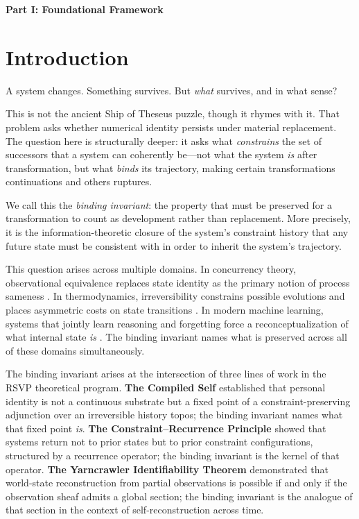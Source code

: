 \documentclass[11pt, letterpaper]{article}
\theoremstyle{plain}
\theoremstyle{definition}
\theoremstyle{remark}
\begin{document}
\newpage

\begin{center}{\large\bfseries Part I: Foundational Framework}\end{center}
\vspace{0.5em}

\section{Introduction}

A system changes. Something survives. But \emph{what} survives, and in what sense?

This is not the ancient Ship of Theseus puzzle, though it rhymes with it. That problem
asks whether numerical identity persists under material replacement. The question here
is structurally deeper: it asks what \emph{constrains} the set of successors that a
system can coherently be---not what the system \emph{is} after transformation, but what
\emph{binds} its trajectory, making certain transformations continuations and others
ruptures.

We call this the \emph{binding invariant}: the property that must be preserved for a
transformation to count as development rather than replacement. More precisely, it is
the information-theoretic closure of the system's constraint history that any future
state must be consistent with in order to inherit the system's trajectory.

This question arises across multiple domains. In concurrency theory, observational
equivalence replaces state identity as the primary notion of process sameness
\cite{haemmerle2011}. In thermodynamics, irreversibility constrains possible
evolutions and places asymmetric costs on state transitions \cite{landauer,bennett,lloyd}.
In modern machine learning, systems that jointly learn reasoning and forgetting force a
reconceptualization of what internal state \emph{is} \cite{ngc2026}. The binding
invariant names what is preserved across all of these domains simultaneously.

The binding invariant arises at the intersection of three lines of work in the RSVP
theoretical program. \textbf{The Compiled Self} established that personal identity is
not a continuous substrate but a fixed point of a constraint-preserving adjunction over
an irreversible history topos; the binding invariant names what that fixed point
\emph{is}. \textbf{The Constraint--Recurrence Principle} showed that systems return
not to prior states but to prior constraint configurations, structured by a recurrence
operator; the binding invariant is the kernel of that operator. \textbf{The Yarncrawler
Identifiability Theorem} demonstrated that world-state reconstruction from partial
observations is possible if and only if the observation sheaf admits a global section;
the binding invariant is the analogue of that section in the context of
self-reconstruction across time.
\end{document}
